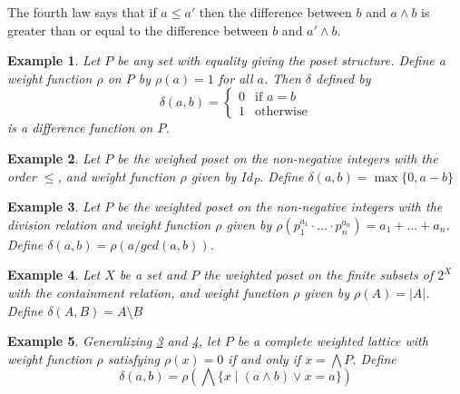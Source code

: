 \documentclass[acmsmall,review,anonymous]{acmart}\settopmatter{printfolios=true,printccs=false,printacmref=false}
\newtheorem{example}{Example}
\begin{document}
The fourth law says that if $a \leq a'$ then the difference between $b$
and $a \wedge b$ is greater than or equal to the difference between $b$ and $a'
\wedge b$.
\fi
\begin{example}\label{embedding}
Let $P$ be any set with equality giving the poset structure. Define
a weight function $\rho$ on $P$ by $\rho(a) = 1$ for all $a$. Then $\delta$
defined by $$ \delta(a, b) =
\begin{cases}
0 & \text{if } a = b\\
1 & \text{otherwise}
\end{cases}
$$
is a difference function on $P$.
\end{example}
\begin{example}\label{naturalnumbers}
Let $P$ be the weighed poset on the non-negative integers with the order $\leq$,
and weight function $\rho$ given by $Id_P$. Define $\delta(a, b) = \max\{0,
a-b\}$
\end{example}
\begin{example}\label{divisibility}
Let $P$ be the weighted poset on the non-negative integers with the division
relation and weight function $\rho$ given by $\rho(p_1^{a_1} \cdot \ldots \cdot
p_n^{a_n}) = a_1 + \ldots + a_n$. Define $\delta(a, b) = \rho(a/gcd(a, b))$.
\end{example}
\begin{example}\label{boolean}
Let $X$ be a set and $P$ the weighted poset on the finite subsets of $2^X$ with
the containment relation, and weight function $\rho$ given by $\rho(A) = |A|$.
Define $\delta(A, B) = A \setminus B$
\end{example}
\begin{example}\label{general}
Generalizing \cref{divisibility} and
\cref{boolean}, let $P$ be a complete weighted lattice with weight function
$\rho$ satisfying $\rho(x) = 0$ if and only if $x = \bigwedge P$. Define
$$\delta(a, b) = \rho\left(\bigwedge \{x \; | \; (a \wedge b) \vee x =
a\}\right)$$
\end{example}
\end{document}
